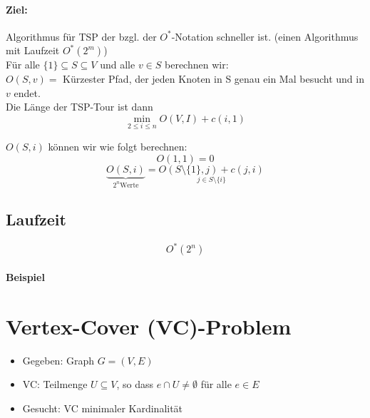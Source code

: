 \paragraph{Ziel:}
Algorithmus für TSP der bzgl. der $O^*$-Notation schneller ist. (einen Algorithmus mit Laufzeit $O^*(2^m)$)\\
Für alle $\{1\}\subseteq S \subseteq V$ und alle $v\in S$ berechnen wir:\\
$O(S,v)=$ Kürzester Pfad, der jeden Knoten in S genau ein Mal besucht und in $v$ endet.\\
Die Länge der TSP-Tour ist dann
\[ \underset{2\leq i \leq n}{\min}O(V,I) + c(i,1) \]
\begin{figure}[H]
\end{figure}
$O(S,i)$ können wir wie folgt berechnen:
\[ O({1},1) = 0 \]
\[ \underset{2^n \text{Werte}}{\underbrace{O(S,i)}} = \underset{j\in S\setminus\{i\} }{O(S\setminus\{1\}, j  ) + c(j,i)} \]
\subsection{Laufzeit}
\[ O^*(2^n) \]
\paragraph{Beispiel}
\section{Vertex-Cover (VC)-Problem}
\begin{figure}[H]
	\centering
\end{figure}
\begin{itemize}
	\item Gegeben: Graph $G=(V,E)$
	\item VC: Teilmenge $U\subseteq V$, so dass $e\cap U \neq \emptyset$ für alle $e\in E$
	\item Gesucht: VC minimaler Kardinalität
\end{itemize}
